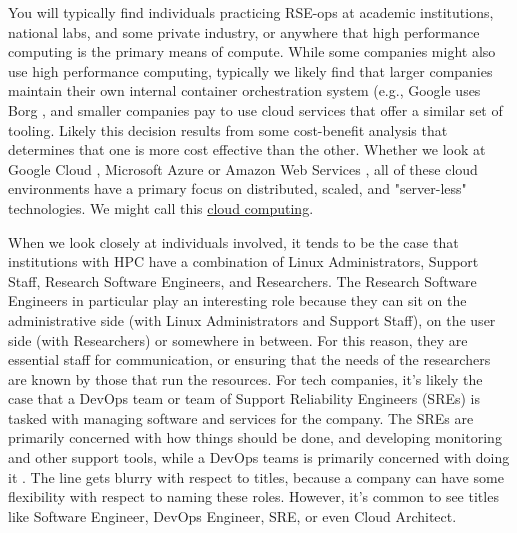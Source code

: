 You will typically find individuals practicing RSE-ops at academic institutions, national labs, and some private industry, or anywhere that high performance computing is the primary means of compute. While some companies might also use high performance computing, typically we likely find that larger companies maintain their own internal container orchestration system (e.g., Google uses Borg \cite{borg}, and smaller companies pay to use cloud services that offer a similar set of tooling. Likely this decision results from some cost-benefit analysis \cite{Prabhakaran2018-sn} that determines that one is more cost effective than the other. Whether we look at Google Cloud \cite{google-devops}, Microsoft Azure \cite{microsoft-devops} or Amazon Web Services \cite{aws}, all of these cloud environments have a primary focus on distributed, scaled, and "server-less" technologies. We might call this \href{https://en.wikipedia.org/wiki/Cloud\_native\_computing}{cloud computing}.

When we look closely at individuals involved, it tends to be the case that institutions with HPC have a combination of Linux Administrators, Support Staff, Research Software Engineers, and Researchers. The Research Software Engineers
in particular play an interesting role because they can sit on the administrative side (with Linux Administrators and Support Staff), on the user side (with Researchers) or somewhere in between. For this reason, they are essential staff for communication, or ensuring that the needs of the researchers are known by those that run the resources.
For tech companies, it's likely the case that a DevOps team or team of Support Reliability Engineers (SREs) is tasked with managing software and services for the company. The SREs are primarily concerned with how things should be done, and developing monitoring and other support tools, while a DevOps teams is primarily concerned with doing it \cite{google-sre}.
The line gets blurry with respect to titles, because a company can have some flexibility with respect to naming these roles. However, it's common to see titles like Software Engineer, DevOps Engineer, SRE, or even Cloud Architect. 
